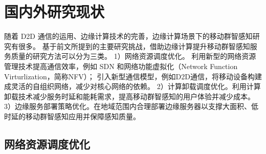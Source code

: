 








\section{国内外研究现状}

随着 D2D 通信的运用、边缘计算技术的完善，边缘计算场景下的移动群智感知研究有很多。
基于前文所提到的主要研究挑战，借助边缘计算提升移动群智感知服务质量的研究方法可以分为三类。
1）网络资源调度优化。%
利用新型的网络资源管理技术提高通信效率，例如 SDN 和网络功能虚拟化（Network Function Virturlization，简称NFV）；
引入新型通信模型，例如D2D通信，将移动设备构建成灵活的自组织网络，减少对核心网络的依赖。
2）计算卸载调度优化。利用计算卸载技术减少服务时延和能耗需求，提高移动群智感知的用户体验并减少成本。
3）边缘服务部署策略优化。在地域范围内合理部署边缘服务器以支撑大面积、低时延的移动群智感知应用并保障感知质量。

\subsection{网络资源调度优化}


